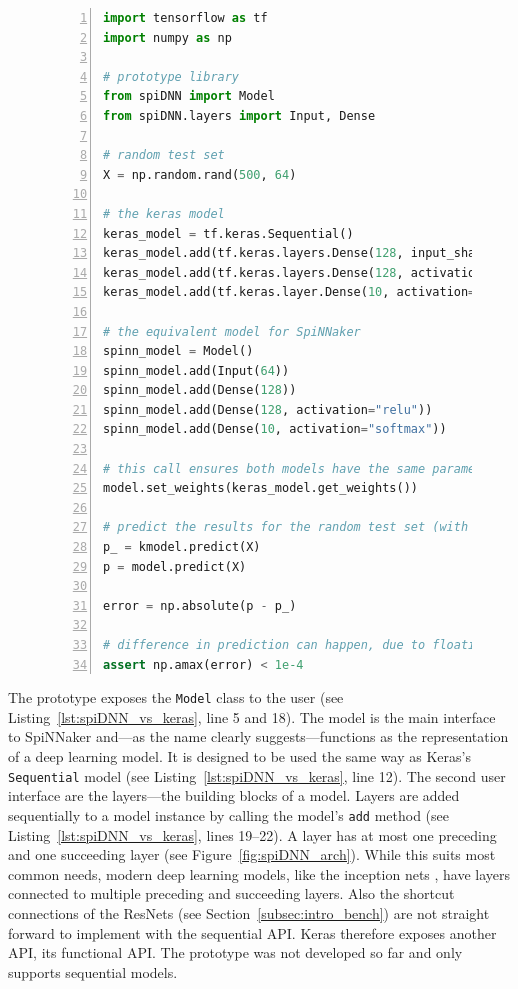 \documentclass[]{article}
\begin{document}
\begin{figure} %
\begin{lstlisting}[language=Python, caption={Example code comparing
  inference with Keras to inference with the prototype. The code would
  result in a model akin to the one shown in
  Figure~\ref{fig:spiDNN_arch}.}, captionpos=b,
  label=lst:spiDNN_vs_keras, numbers=left]
import tensorflow as tf
import numpy as np

# prototype library
from spiDNN import Model
from spiDNN.layers import Input, Dense

# random test set
X = np.random.rand(500, 64)

# the keras model
keras_model = tf.keras.Sequential()
keras_model.add(tf.keras.layers.Dense(128, input_shape=(64,)))
keras_model.add(tf.keras.layers.Dense(128, activation="relu"))
keras_model.add(tf.keras.layer.Dense(10, activation="softmax"))

# the equivalent model for SpiNNaker
spinn_model = Model()
spinn_model.add(Input(64))
spinn_model.add(Dense(128))
spinn_model.add(Dense(128, activation="relu"))
spinn_model.add(Dense(10, activation="softmax"))

# this call ensures both models have the same parameters
model.set_weights(keras_model.get_weights())

# predict the results for the random test set (with random weights)
p_ = kmodel.predict(X)
p = model.predict(X)

error = np.absolute(p - p_)

# difference in prediction can happen, due to floating point errors
assert np.amax(error) < 1e-4
\end{lstlisting}
\end{figure} %

The prototype exposes the \texttt{Model} class to the user
(see Listing~\ref{lst:spiDNN_vs_keras}, line 5 and 18).
The model is the main interface to SpiNNaker and---as the name
clearly suggests---functions as the representation of a deep learning
model.
It is designed to be used the same way as Keras's \texttt{Sequential}
model (see Listing~\ref{lst:spiDNN_vs_keras}, line 12).
The second user interface are the layers---the building blocks of
a model.
Layers are added sequentially to a model instance by calling the
model's \texttt{add} method (see Listing~\ref{lst:spiDNN_vs_keras},
lines 19--22).
A layer has at most one preceding and one succeeding layer
(see Figure~\ref{fig:spiDNN_arch}).
While this suits most common needs, modern deep learning models,
like the inception nets \citep{szegedy_et_al_2014}, have layers
connected to multiple preceding and succeeding layers.
Also the shortcut connections of the ResNets (see
Section~\ref{subsec:intro_bench}) are not straight forward to
implement with the sequential API.
Keras therefore exposes another API, its functional API.
The prototype was not developed so far and only supports sequential
models.
\end{document}
